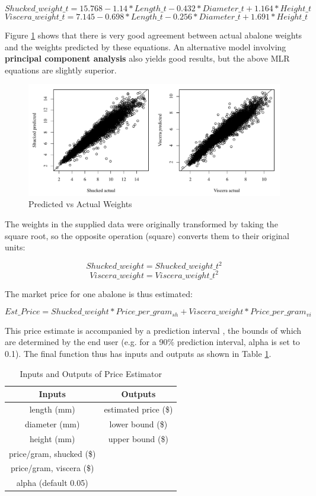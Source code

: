\documentclass[11pt, a4paper]{article}
\begin{document}
    $$ Shucked\_weight\_t = 15.768 - 1.14*Length\_t - 0.432*Diameter\_t + 1.164*Height\_t $$
    $$ Viscera\_weight\_t = 7.145 - 0.698*Length\_t - 0.256*Diameter\_t + 1.691*Height\_t $$

    Figure \ref{mlr} shows that there is very good agreement between actual abalone weights and the weights predicted by these equations. An alternative model involving \textbf{principal component analysis} \parencite{pca} also yields good results, but the above MLR equations are slightly superior.

    \begin{figure}[hbt!]
        \centering
        \includegraphics[width=\textwidth]{3.2.pdf}
        \caption{Predicted vs Actual Weights}
        \label{mlr}
    \end{figure}

    The weights in the supplied data were originally transformed by taking the square root, so the opposite operation (square) converts them to their original units:

    $$ Shucked\_weight = Shucked\_weight\_t ^ 2 $$
    $$ Viscera\_weight = Viscera\_weight\_t ^ 2 $$

    The market price for one abalone is thus estimated:

    $$ Est\_Price = Shucked\_weight * Price\_per\_gram_{sh} + Viscera\_weight * Price\_per\_gram_{vi} $$

    This price estimate is accompanied by a prediction interval \parencite{pi}, the bounds of which are determined by the end user (e.g. for a 90\% prediction interval, alpha is set to 0.1). The final function thus has inputs and outputs as shown in Table \ref{function}.

    \begin{table}[ht]
        \centering
        \begin{tabular}{|c|c|}
            \hline
            Inputs & Outputs \\
            \hline
            length (mm) & estimated price (\$) \\
            diameter (mm) & lower bound (\$) \\
            height (mm) & upper bound (\$) \\
            price/gram, shucked (\$) & \\
            price/gram, viscera (\$) & \\
            alpha (default 0.05) & \\
            \hline
        \end{tabular}
        \caption{Inputs and Outputs of Price Estimator}
        \label{function}
    \end{table}
\end{document}
